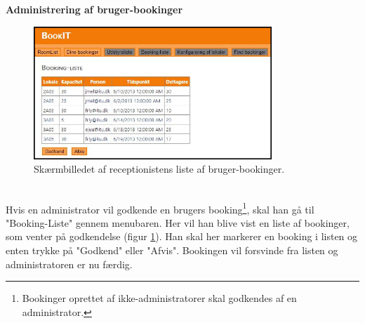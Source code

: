 \textbf{Administrering af bruger-bookinger}
\begin{figure}[h!]
  \centering
    \includegraphics[width=0.8\textwidth]{Appendix/GUI-Prototype/DigitalMockup/BookingListe}
  \caption{Skærmbilledet af receptionistens liste af bruger-bookinger.}
\label{Design_G_Development_BookingListe_Final}
\end{figure} 
\\Hvis en administrator vil godkende en brugers booking\footnote{Bookinger oprettet af ikke-administratorer skal godkendes af en administrator.}, skal han gå til "Booking-Liste" gennem menubaren. Her vil han blive vist en liste af bookinger, som venter på godkendelse (figur \ref{Design_G_Development_BookingListe_Final}). Han skal her markerer en booking i listen og enten trykke på "Godkend" eller "Afvis". Bookingen vil forsvinde fra listen og administratoren er nu færdig.

